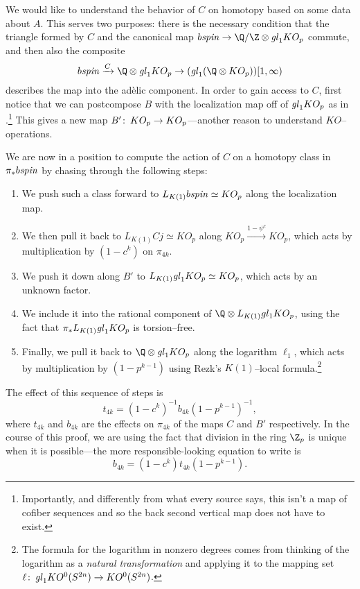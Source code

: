 We would like to understand the behavior of $C$ on homotopy based on some data about $A$.  This serves two purposes: there is the necessary condition that the triangle formed by $C$ and the canonical map $b\spin \to \Q / \Z \otimes \gl_1 KO_p$ commute, and then also the composite \[b\spin \xrightarrow{C} \Q \otimes \gl_1 KO_p \to (\gl_1 (\Q \otimes KO_p))[1, \infty)\] describes the map into the ad\`elic component.  In order to gain access to $C$, first notice that we can postcompose $B$ with the localization map off of $\mathit{gl}_1 KO_p$ as in .\footnote{Importantly, and differently from what every source says, this isn't a map of cofiber sequences and so the back second vertical map does not have to exist.}  This gives a new map $B'\colon\thinspace KO_p \to KO_p$---another reason to understand $KO$--operations.

We are now in a position to compute the action of $C$ on a homotopy class in $\pi_* b\mathit{spin}$ by chasing through the following steps:
\begin{enumerate}
    \item We push such a class forward to $L_{K(1)} b\mathit{spin} \simeq KO_p$ along the localization map.
    \item We then pull it back to $L_{K(1)} Cj \simeq KO_p$ along $KO_p \xrightarrow{1 - \psi^c} KO_p$, which acts by multiplication by $(1 - c^k)$ on $\pi_{4k}$.
    \item We push it down along $B'$ to $L_{K(1)} \mathit{gl}_1 KO_p \simeq KO_p$, which acts by an unknown factor.
    \item We include it into the rational component of $\Q \otimes L_{K(1)} gl_1 KO_p$, using the fact that $\pi_* L_{K(1)} \mathit{gl}_1 KO_p$ is torsion--free.
    \item Finally, we pull it back to $\Q \otimes \gl_1 KO_p$ along the logarithm $\ell_1$, which acts by multiplication by $(1 - p^{k-1})$ using Rezk's $K(1)$--local formula.\footnote{The formula for the logarithm in nonzero degrees comes from thinking of the logarithm as a \emph{natural transformation} and applying it to the mapping set $\ell\colon\thinspace \mathit{gl}_1 KO^0(S^{2n}) \to KO^0(S^{2n})$.}
\end{enumerate}
The effect of this sequence of steps is \[t_{4k} = (1 - c^k)^{-1} b_{4k} (1 - p^{k-1})^{-1},\] where $t_{4k}$ and $b_{4k}$ are the effects on $\pi_{4k}$ of the maps $C$ and $B'$ respectively.  In the course of this proof, we are using the fact that division in the ring $\Z_p$ is unique when it is possible---the more responsible-looking equation to write is \[b_{4k} = (1 - c^k) t_{4k} (1 - p^{k-1}).\]


